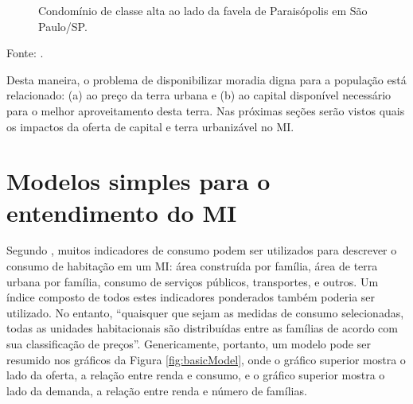 \documentclass[
	12pt,				%
	oneside,			%
	a4paper,			%
	chapter=TITLE,		%
	section=TITLE,		%
	english,			%
	brazil				%
	]{abntex2}
\newcommand{\bcenter}{\begin{center}}
\newcommand{\ecenter}{\end{center}}
\begin{document}
\begin{refsection}
\begin{figure}[H]
{}

\caption{Condomínio de classe alta ao lado da favela de Paraisópolis em São Paulo/SP.}\label{fig:injustica}
\end{figure}
\bcenter

Fonte: \textcite{paraisopolis}.
\ecenter

Desta maneira, o problema de disponibilizar moradia digna para a população
está relacionado: (a) ao preço da terra urbana e (b) ao capital disponível
necessário para o melhor aproveitamento desta terra. Nas próximas seções serão
vistos quais os impactos da oferta de capital e terra urbanizável no \gls{MI}.

\hypertarget{modelos-simples-para-o-entendimento-do}{%
\section{\texorpdfstring{Modelos simples para o entendimento do \gls{MI}}{Modelos simples para o entendimento do }}\label{modelos-simples-para-o-entendimento-do}}

Segundo \textcite[p.~247]{bertaud}, muitos indicadores de consumo podem ser utilizados
para descrever o consumo de habitação em um \gls{MI}: área construída por
família, área de terra urbana por família, consumo de serviços públicos,
transportes, e outros. Um índice composto de todos estes indicadores ponderados
também poderia ser utilizado. No entanto, ``quaisquer que sejam as medidas de
consumo selecionadas, todas as unidades habitacionais são distribuídas entre as
famílias de acordo com sua classificação de preços''. Genericamente, portanto, um
modelo pode ser resumido nos gráficos da Figura \ref{fig:basicModel}, onde o
gráfico superior mostra o lado da oferta, a relação entre renda e consumo, e o
gráfico superior mostra o lado da demanda, a relação entre renda e número de
famílias.
\begin{figure}[H]


\end{figure}
\end{refsection}
\end{document}
